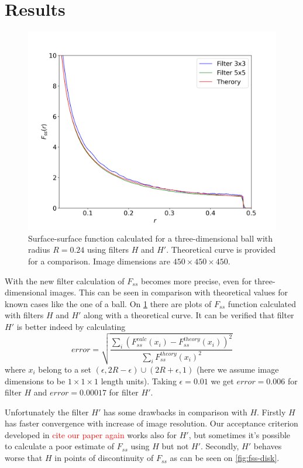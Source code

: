 \documentclass[reprint,amsmath,amssymb,aps,pre,showkeys,showpacs]{revtex4-1}
\begin{document}
\section{Results}
\begin{figure}
  \centering
  \includegraphics[width=\linewidth]{images/ball-3d-ss.png}
  \caption[]{Surface-surface function calculated for a three-dimensional ball
    with radius $R = 0.24$ using filters $H$ and $H'$. Theoretical curve is
    provided for a comparison. Image dimensions are $450 \times 450 \times 450$.}
  \label{fig:fss-ball}
\end{figure}
With the new filter calculation of $F_{ss}$ becomes more precise, even for
three-dimensional images. This can be seen in comparison with theoretical values
for known cases like the one of a ball. On \cref{fig:fss-ball} there are plots
of $F_{ss}$ function calculated with filters $H$ and $H'$ along with a
theoretical curve. It can be verified that filter $H'$ is better indeed by
calculating
\begin{equation*}
  error = \sqrt{\frac{\sum_i (F_{ss}^{calc}(x_i) -
      F_{ss}^{theory}(x_i))^2}{\sum_i F_{ss}^{theory}(x_i)^2}}
\end{equation*}
where $x_i$ belong to a set
$(\epsilon, 2R - \epsilon) \cup (2R + \epsilon, 1)$ (here we assume image
dimensions to be $1 \times 1 \times 1$ length units). Taking
$\epsilon = 0.01$ we get $error = 0.006$ for filter $H$ and $error = 0.00017$
for filter $H'$.

Unfortunately the filter $H'$ has some drawbacks in comparison with $H$. Firstly
$H$ has faster convergence with increase of image resolution. Our
acceptance criterion developed in \textcolor{red}{cite our paper again} works
also for $H'$, but sometimes it's possible to calculate a poor estimate of
$F_{ss}$ using $H$ but not $H'$. Secondly, $H'$ behaves worse that $H$ in points
of discontinuity of $F_{ss}$ as can be seen on \cref{fig:fss-disk}.
\end{document}
